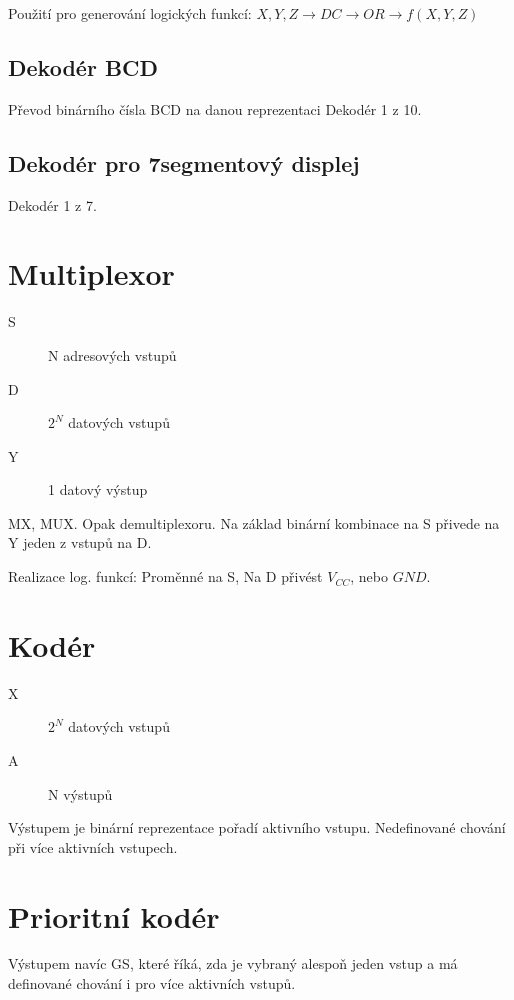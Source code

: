 \documentclass[a4paper, 11pt]{report}
\begin{document}
Použití pro generování logických funkcí: $X,Y,Z \to DC \to OR \to f(X,Y,Z)$

\subsection{Dekodér BCD}

Převod binárního čísla BCD na danou reprezentaci Dekodér 1 z 10.

\subsection{Dekodér pro 7segmentový displej}

Dekodér 1 z 7. 

\section{Multiplexor}

\begin{description}
	\item[S] N adresových vstupů
	\item[D] $2^N$ datových vstupů
	\item[Y] 1 datový výstup
\end{description}

MX, MUX. Opak demultiplexoru. Na základ binární kombinace na S přivede na Y jeden z vstupů na D.

Realizace log. funkcí: Proměnné na S, Na D přivést $V_{CC}$, nebo $GND$.

\section{Kodér}

\begin{description}
	\item[X] $2^N$ datových vstupů
	\item[A] N výstupů
\end{description}

Výstupem je binární reprezentace pořadí aktivního vstupu. Nedefinované chování při více aktivních vstupech.

\section{Prioritní kodér}

Výstupem navíc GS, které říká, zda je vybraný alespoň jeden vstup a má definované chování i pro více aktivních vstupů.
\end{document}
